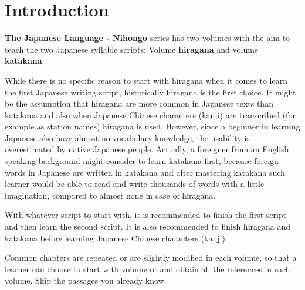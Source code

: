 \chapter*{Introduction}
\label{chap:Introduction}


\textbf{The Japanese Language - Nihongo} series has two volumes with the aim to
teach the two Japanese syllable scripts: Volume  \textbf{hiragana}
and volume  \textbf{katakana}.%
%
%

While there is no specific reason to start with hiragana when it comes to learn
the first Japanese writing script, historically hiragana is the first choice.
It might be the assumption that hiragana are more common in Japanese texts than
katakana and also when Japanese Chinese characters (kanji) are transcribed (for
example as station names) hiragana is used. However, since a beginner in
learning Japanese also have almost no vocabulary knowledge, the usability is
overestimated by native Japanese people. Actually, a foreigner from an English
speaking background might consider to learn katakana first, because foreign
words in Japanese are written in katakana and after mastering katakana such
learner would be able to read and write thousands of words with a little
imagination, compared to almost none in case of hiragana.

With whatever script to start with, it is recommended to finish the first
script and then learn the second script. It is also recommended to finish
hiragana and katakana before learning Japanese Chinese characters (kanji).

Common chapters are repeated or are slightly modified in each volume, so that a
learner can choose to start with volume {} or {} and
obtain all the references in each volume. Skip the passages you already know.




